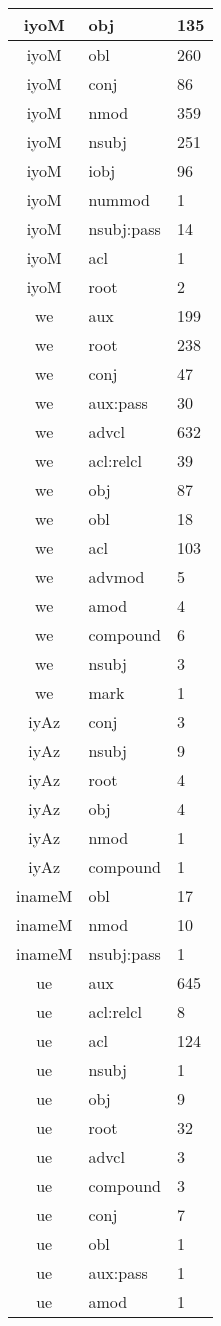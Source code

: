 \documentclass[a4 paper]{article}
\begin{document}
\begin{longtable}{cp{}p{}}
iyoM & obj & 135\\ \midrule iyoM & obl & 260\\ \midrule iyoM & conj & 86\\ \midrule iyoM & nmod & 359\\ \midrule iyoM & nsubj & 251\\ \midrule iyoM & iobj & 96\\ \midrule iyoM & nummod & 1\\ \midrule iyoM & nsubj:pass & 14\\ \midrule iyoM & acl & 1\\ \midrule iyoM & root & 2\\ \midrule 
we & aux & 199\\ \midrule we & root & 238\\ \midrule we & conj & 47\\ \midrule we & aux:pass & 30\\ \midrule we & advcl & 632\\ \midrule we & acl:relcl & 39\\ \midrule we & obj & 87\\ \midrule we & obl & 18\\ \midrule we & acl & 103\\ \midrule we & advmod & 5\\ \midrule we & amod & 4\\ \midrule we & compound & 6\\ \midrule we & nsubj & 3\\ \midrule we & mark & 1\\ \midrule 
iyAz & conj & 3\\ \midrule iyAz & nsubj & 9\\ \midrule iyAz & root & 4\\ \midrule iyAz & obj & 4\\ \midrule iyAz & nmod & 1\\ \midrule iyAz & compound & 1\\ \midrule 
inameM & obl & 17\\ \midrule inameM & nmod & 10\\ \midrule inameM & nsubj:pass & 1\\ \midrule 
ue & aux & 645\\ \midrule ue & acl:relcl & 8\\ \midrule ue & acl & 124\\ \midrule ue & nsubj & 1\\ \midrule ue & obj & 9\\ \midrule ue & root & 32\\ \midrule ue & advcl & 3\\ \midrule ue & compound & 3\\ \midrule ue & conj & 7\\ \midrule ue & obl & 1\\ \midrule ue & aux:pass & 1\\ \midrule ue & amod & 1\\ \midrule 

\end{longtable}
\end{document}
